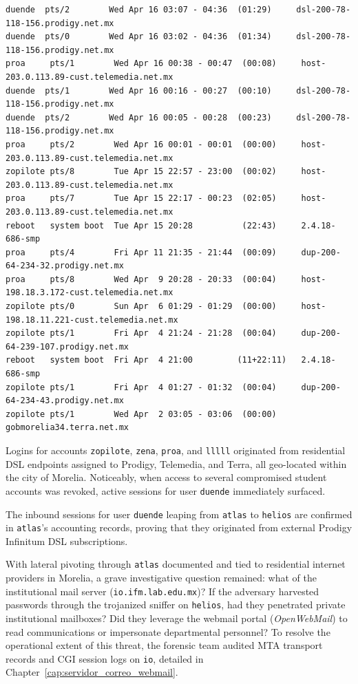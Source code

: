 \begin{lstlisting}[style=terminal]
duende  pts/2        Wed Apr 16 03:07 - 04:36  (01:29)     dsl-200-78-118-156.prodigy.net.mx
duende  pts/0        Wed Apr 16 03:02 - 04:36  (01:34)     dsl-200-78-118-156.prodigy.net.mx
proa     pts/1        Wed Apr 16 00:38 - 00:47  (00:08)     host-203.0.113.89-cust.telemedia.net.mx
duende  pts/1        Wed Apr 16 00:16 - 00:27  (00:10)     dsl-200-78-118-156.prodigy.net.mx
duende  pts/2        Wed Apr 16 00:05 - 00:28  (00:23)     dsl-200-78-118-156.prodigy.net.mx
proa     pts/2        Wed Apr 16 00:01 - 00:01  (00:00)     host-203.0.113.89-cust.telemedia.net.mx
zopilote pts/8        Tue Apr 15 22:57 - 23:00  (00:02)     host-203.0.113.89-cust.telemedia.net.mx
proa     pts/7        Tue Apr 15 22:17 - 00:23  (02:05)     host-203.0.113.89-cust.telemedia.net.mx
reboot   system boot  Tue Apr 15 20:28          (22:43)     2.4.18-686-smp
proa     pts/4        Fri Apr 11 21:35 - 21:44  (00:09)     dup-200-64-234-32.prodigy.net.mx
proa     pts/8        Wed Apr  9 20:28 - 20:33  (00:04)     host-198.18.3.172-cust.telemedia.net.mx
zopilote pts/0        Sun Apr  6 01:29 - 01:29  (00:00)     host-198.18.11.221-cust.telemedia.net.mx
zopilote pts/1        Fri Apr  4 21:24 - 21:28  (00:04)     dup-200-64-239-107.prodigy.net.mx
reboot   system boot  Fri Apr  4 21:00         (11+22:11)   2.4.18-686-smp
zopilote pts/1        Fri Apr  4 01:27 - 01:32  (00:04)     dup-200-64-234-43.prodigy.net.mx
zopilote pts/1        Wed Apr  2 03:05 - 03:06  (00:00)     gobmorelia34.terra.net.mx
\end{lstlisting}

\vspace{1em}

Logins for accounts \texttt{zopilote}, \texttt{zena}, \texttt{proa}, and \texttt{lllll} originated from residential DSL endpoints assigned to Prodigy, Telemedia, and Terra, all geo-located within the city of Morelia. Noticeably, when access to several compromised student accounts was revoked, active sessions for user \texttt{duende} immediately surfaced.

The inbound sessions for user \texttt{duende} leaping from \texttt{atlas} to \texttt{helios} are confirmed in \texttt{atlas}'s accounting records, proving that they originated from external Prodigy Infinitum DSL subscriptions.

With lateral pivoting through \texttt{atlas} documented and tied to residential internet providers in Morelia, a grave investigative question remained: what of the institutional mail server (\texttt{io.ifm.lab.edu.mx})? If the adversary harvested passwords through the trojanized sniffer on \texttt{helios}, had they penetrated private institutional mailboxes? Did they leverage the webmail portal (\textit{OpenWebMail}) to read communications or impersonate departmental personnel? To resolve the operational extent of this threat, the forensic team audited MTA transport records and CGI session logs on \texttt{io}, detailed in Chapter~\ref{cap:servidor_correo_webmail}.

